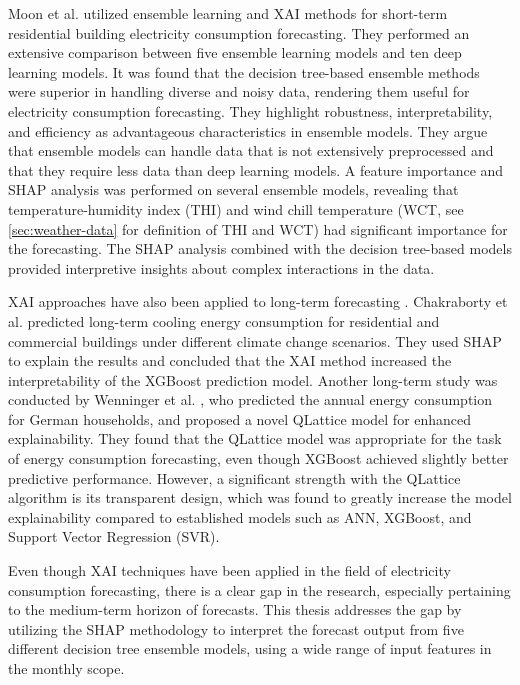 Moon et al. \cite{moon_advancing_2024} utilized ensemble learning and XAI methods for short-term residential building electricity consumption forecasting. They performed an extensive comparison between five ensemble learning models and ten deep learning models. It was found that the decision tree-based ensemble methods were superior in handling diverse and noisy data, rendering them useful for electricity consumption forecasting. They highlight robustness, interpretability, and efficiency as advantageous characteristics in ensemble models. They argue that ensemble models can handle data that is not extensively preprocessed and that they require less data than deep learning models. A feature importance and SHAP analysis was performed on several ensemble models, revealing that temperature-humidity index (THI) and wind chill temperature (WCT, see \autoref{sec:weather-data} for definition of THI and WCT) had significant importance for the forecasting. The SHAP analysis combined with the decision tree-based models provided interpretive insights about complex interactions in the data.

XAI approaches have also been applied to long-term forecasting \cite{machlev_explainable_2022}. Chakraborty et al.
\cite{chakraborty_scenario-based_2021} predicted long-term cooling energy consumption for residential and commercial buildings under different climate change scenarios. They used SHAP to explain the results and concluded that the XAI method increased the interpretability of the XGBoost prediction model. Another long-term study was conducted by Wenninger et al. \cite{wenninger_explainable_2022}, who predicted the annual energy consumption for German households, and proposed a novel QLattice model for enhanced explainability. They found that the QLattice model was appropriate for the task of energy consumption forecasting, even though XGBoost achieved slightly better predictive performance. However, a significant strength with the QLattice algorithm is its transparent design, which was found to greatly increase the model explainability compared to established models such as ANN, XGBoost, and Support Vector Regression (SVR).

Even though XAI techniques have been applied in the field of electricity consumption forecasting, there is a clear gap in the research, especially pertaining to the medium-term horizon of forecasts. This thesis addresses the gap by utilizing the SHAP methodology to interpret the forecast output from five different decision tree ensemble models, using a wide range of input features in the monthly scope.
